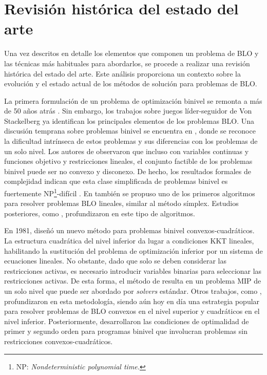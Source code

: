 \section{Revisión histórica del estado del arte}\label{sec:evol_hist_fundBLO}


Una vez descritos en detalle los elementos que componen un problema de BLO y las técnicas más habituales para abordarlos, se procede a realizar una revisión histórica del estado del arte. Este análisis proporciona un contexto sobre la evolución y el estado actual de los métodos de solución para problemas de BLO.

La primera formulación de un problema de optimización binivel se remonta a más de 50 años atrás \cite{bracken1973mathematical}. Sin embargo, los trabajos sobre juegos líder-seguidor de Von Stackelberg \cite{von2010market,stackelberg1952theory} ya identifican los principales elementos de los problemas BLO. Una discusión temprana sobre problemas binivel se encuentra en \cite{candler1977multilevel}, donde se reconoce la dificultad intrínseca de estos problemas y sus diferencias con los problemas de un solo nivel. Los autores de \cite{candler1977multilevel} observaron que incluso con variables continuas y funciones objetivo y restricciones lineales, el conjunto factible de los problemas binivel puede ser no convexo y disconexo. De hecho, los resultados formales de complejidad indican que esta clase simplificada de problemas binivel es fuertemente NP\footnote{NP: \emph{Nondeterministic polynomial time.}}-difícil . En \cite{candler1977multilevel} también se propuso uno de los primeros algoritmos para resolver problemas BLO lineales, similar al método símplex. Estudios posteriores, como \cite{bialas1978multilevel}, profundizaron en este tipo de algoritmos.

En 1981, \cite{fortuny1981representation} diseñó un nuevo método para problemas binivel convexos-cuadráticos. La estructura cuadrática del nivel inferior da lugar a condiciones KKT lineales, habilitando la sustitución del problema de optimización inferior por un sistema de ecuaciones lineales. No obstante, dado que solo se deben considerar las restricciones activas, es necesario introducir variables binarias para seleccionar las restricciones activas. De esta forma, el método de \cite{fortuny1981representation} resulta en un problema MIP de un solo nivel que puede ser abordado por \emph{solvers} estándar. Otros trabajos, como \cite{bard1990branch,bard1988convex,edmunds1991algorithms,hansen1992new}, profundizaron en esta metodología, siendo aún hoy en día una estrategia popular para resolver problemas de BLO convexos en el nivel superior y cuadráticos en el nivel inferior. Posteriormente, \cite{ye1995optimality,dempe1992necessary,dempe1992optimality,yezza1996first,outrata1993necessary} desarrollaron las condiciones de optimalidad de primer y segundo orden para programas binivel que involucran problemas sin restricciones convexos-cuadráticos.

